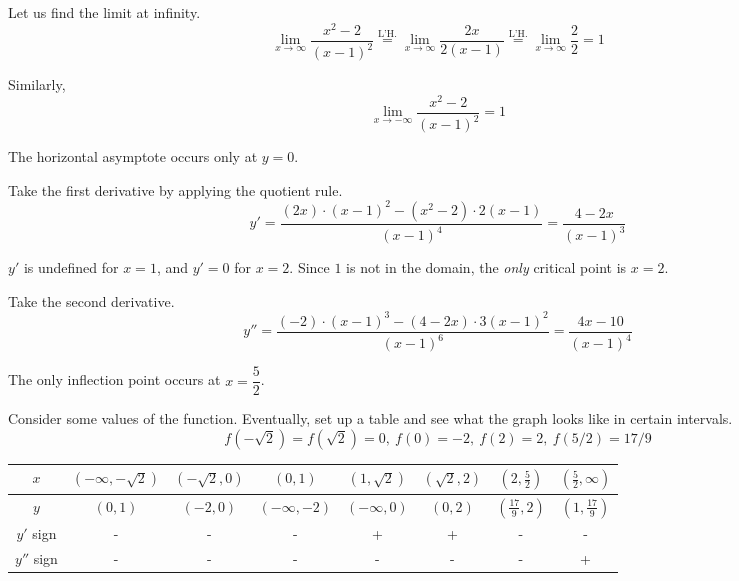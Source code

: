 \documentclass[a4paper, 12pt]{article}
\begin{document}
\begin{enumerate}[leftmargin=*,label=\textbf{\arabic*.}]
Let us find the limit at infinity.
\[\lim_{x\to \infty}\frac{x^2-2}{(x-1)^2}\overset{\text{L'H.}}{=}\lim_{x\to \infty}\frac{2x}{2(x-1)}\overset{\text{L'H.}}{=}\lim_{x\to\infty}\frac{2}{2}=1\]

Similarly,
\[\lim_{x\to-\infty}\frac{x^2-2}{(x-1)^2}=1\]

The horizontal asymptote occurs only at $y=0$.

Take the first derivative by applying the quotient rule.
\[y'=\frac{(2x)\cdot(x-1)^2-\left(x^2-2\right)\cdot2(x-1)}{(x-1)^4}=\frac{4-2x}{(x-1)^3}\]

$y'$ is undefined for $x=1$, and $y'=0$ for $x=2$. Since $1$ is not in the domain, the \textit{only} critical point is $x = 2$.

Take the second derivative.
\[y''=\frac{(-2)\cdot(x-1)^3-(4-2x)\cdot3(x-1)^2}{(x-1)^6}=\frac{4x-10}{(x-1)^4}\]

The only inflection point occurs at $x=\dfrac52$.

Consider some values of the function. Eventually, set up a table and see what the graph looks like in certain intervals.
\[f\left(-\sqrt2\right)=f\left(\sqrt2\right)=0,\:f(0)=-2,\:f(2)=2,\:f(5/2)=17/9\]
\begin{center}
    \begin{tabular}{ |c| c c c c c c c| } 
    \hline
        $x$ & $(-\infty, -\sqrt2)$ & $(-\sqrt2, 0)$&$\left(0, 1\right)$ & $\left(1,\sqrt2\right)$ & $\left(\sqrt2, 2\right)$ & $\left(2, \frac52\right)$ & $\left(\frac52, \infty\right)$  \\
        \hline
        $y$ & $(0, 1)$ &$(-2,0)$ & $(-\infty, -2)$& $(-\infty, 0)$& $(0, 2)$& $\left(\frac{17}9, 2\right)$& $\left(1, \frac{17}9\right)$\\
        \hline
        $y'$ sign & - & - & - &+&+&-&- \\
        \hline
        $y''$ sign & - &- &-&-&-&-&+ \\
        \hline
    \end{tabular}
\end{center}
\begin{center}
\end{center}
\end{enumerate}
\end{document}
